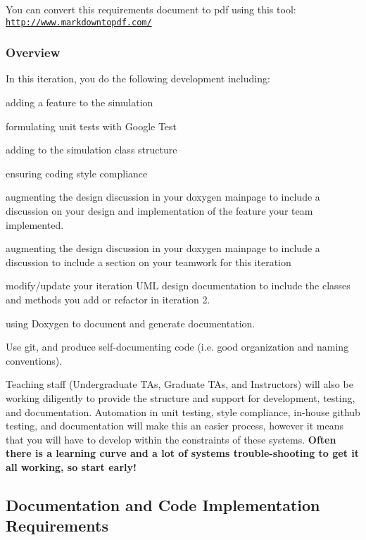 You can convert this requirements document to pdf using this tool\+: \href{http://www.markdowntopdf.com/}{\tt http\+://www.\+markdowntopdf.\+com/}





\subsubsection*{Overview}

In this iteration, you do the following development including\+:


\begin{DoxyItemize}
\item adding a feature to the simulation
\item formulating unit tests with Google Test
\item adding to the simulation class structure
\item ensuring coding style compliance
\item augmenting the design discussion in your doxygen mainpage to include a discussion on your design and implementation of the feature your team implemented.
\item augmenting the design discussion in your doxygen mainpage to include a discussion to include a section on your teamwork for this iteration
\item modify/update your iteration U\+ML design documentation to include the classes and methods you add or refactor in iteration 2.
\item using Doxygen to document and generate documentation.
\item Use git, and produce self-\/documenting code (i.\+e. good organization and naming conventions).
\end{DoxyItemize}

Teaching staff (Undergraduate TA\textquotesingle{}s, Graduate TA\textquotesingle{}s, and Instructors) will also be working diligently to provide the structure and support for development, testing, and documentation. Automation in unit testing, style compliance, in-\/house github testing, and documentation will make this an easier process, however it means that you will have to develop within the constraints of these systems. {\bfseries Often there is a learning curve and a lot of systems trouble-\/shooting to get it all working, so start early!}

\subsection*{Documentation and Code Implementation Requirements}


